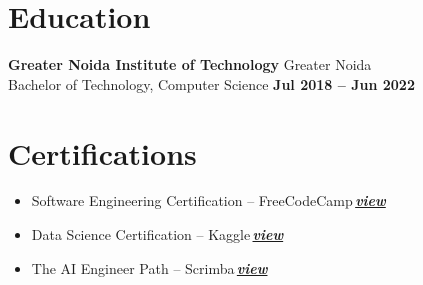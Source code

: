 \documentclass[a4paper,9pt]{article}
\newcommand{\certlink}[1]{\,\href{#1}{\normalfont\textbf{\textit{view}}}}
\begin{document}
\vspace{0.5mm}


\section*{Education}

{\footnotesize

\textbf{Greater Noida Institute of Technology}
\hfill Greater Noida \\
Bachelor of Technology, Computer Science
\hfill \textbf{Jul 2018 -- Jun 2022}

}

\vspace{0.5mm}


\section*{Certifications}

{\footnotesize
\begin{itemize}
\item Software Engineering Certification -- FreeCodeCamp\certlink{https://freecodecamp.org/certification/poi5en/responsive-web-design}
\item Data Science Certification -- Kaggle\certlink{https://www.kaggle.com/learn/certification/poi5en/intro-to-machine-learning}
\item The AI Engineer Path -- Scrimba\certlink{https://scrimba.com/@Poi5eN:certs;cert24zAwJ77fGRrQpDhLX2CWRiqLcRZxWwi6Jn34}
\end{itemize}
}
\end{document}
